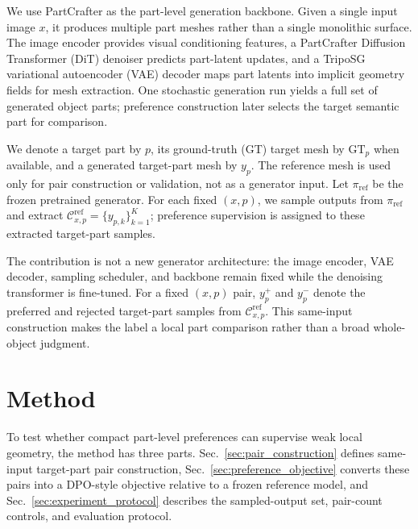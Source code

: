 \documentclass[10pt,twocolumn,letterpaper]{article}
\newcommand{\SK}[1]{\textcolor{blue}{[{\sc SK}] #1}}
\begin{document}
We use PartCrafter \cite{lin2025partcrafter} as the part-level generation backbone. Given a single input image $x$, it produces multiple part meshes rather than a single monolithic surface. The image encoder provides visual conditioning features, a PartCrafter Diffusion Transformer (DiT) denoiser predicts part-latent updates, and a TripoSG variational autoencoder (VAE) decoder \cite{li2025triposg} maps part latents into implicit geometry fields for mesh extraction. One stochastic generation run yields a full set of generated object parts; preference construction later selects the target semantic part for comparison.

We denote a target part by $p$, its ground-truth (GT) target mesh by $\mathrm{GT}_p$ when available, and a generated target-part mesh by $y_p$. The reference mesh is used only for pair construction or validation, not as a generator input. Let $\pi_{\mathrm{ref}}$ be the frozen pretrained generator. For each fixed $(x,p)$, we sample outputs from $\pi_{\mathrm{ref}}$ and extract $\mathcal{C}_{x,p}^{\mathrm{ref}}=\{y_{p,k}\}_{k=1}^{K}$; preference supervision is assigned to these extracted target-part samples.

The contribution is not a new generator architecture: the image encoder, VAE decoder, sampling scheduler, and backbone remain fixed while the denoising transformer is fine-tuned. For a fixed $(x,p)$ pair, $y_p^+$ and $y_p^-$ denote the preferred and rejected target-part samples from $\mathcal{C}_{x,p}^{\mathrm{ref}}$. This same-input construction makes the label a local part comparison rather than a broad whole-object judgment.

\section{Method}
To test whether compact part-level preferences can supervise weak local geometry, the method has three parts. Sec.~\ref{sec:pair_construction} defines same-input target-part pair construction, Sec.~\ref{sec:preference_objective} converts these pairs into a DPO-style objective relative to a frozen reference model, and Sec.~\ref{sec:experiment_protocol} describes the sampled-output set, pair-count controls, and evaluation protocol.
\end{document}
